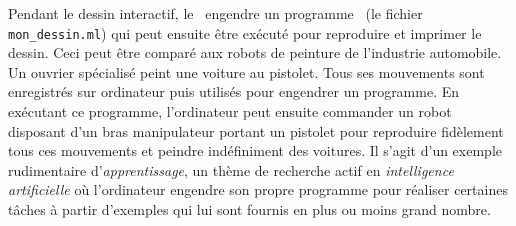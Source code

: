 {\begin{minipage}{\myparboxwidth}
Pendant le dessin interactif, le \robot\ engendre un programme \ocaml\ 
(le fichier {\tt mon\_dessin.ml})
qui peut ensuite être exécuté
pour reproduire et imprimer le dessin. Ceci peut être comparé aux robots
de peinture de l'industrie automobile. Un ouvrier spécialisé peint une
voiture au pistolet. Tous ses mouvements sont en\-re\-gis\-trés sur 
ordinateur puis utilisés pour engendrer un programme. En exécutant ce 
programme, l'ordinateur peut ensuite commander un robot disposant d'un bras 
manipulateur portant un pistolet pour reproduire fidèlement tous ces 
mouvements et peindre indéfiniment des voitures. Il s'agit d'un exemple rudimentaire
d'{\em apprentissage}, un thème de recherche actif en {\em intelligence
artificielle} où l'ordinateur engendre son propre 
programme pour réaliser certaines tâches à partir d'exemples qui lui sont fournis
en plus ou moins grand nombre.

\vspace{\abovedisplayskip}
\end{minipage}
}

\noindent {}
